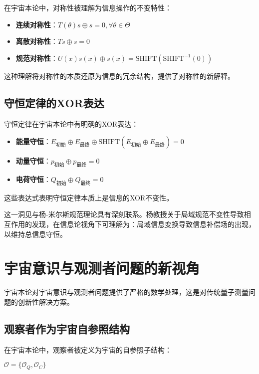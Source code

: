 在宇宙本论中，对称性被理解为信息操作的不变特性：

\begin{itemize}
  \item \textbf{连续对称性}：$T(\theta)s \oplus s = 0, \forall \theta \in \Theta$
  \item \textbf{离散对称性}：$Ts \oplus s = 0$
  \item \textbf{规范对称性}：$U(x)s(x) \oplus s(x) = \text{SHIFT}(\text{SHIFT}^{-1}(0))$
\end{itemize}

这种理解将对称性的本质还原为信息的冗余结构，提供了对称性的新解释。

\subsection{守恒定律的XOR表达}

守恒定律在宇宙本论中有明确的XOR表达：

\begin{itemize}
  \item \textbf{能量守恒}：$E_{\text{初始}} \oplus E_{\text{最终}} \oplus \text{SHIFT}(E_{\text{初始}} \oplus E_{\text{最终}}) = 0$
  \item \textbf{动量守恒}：$p_{\text{初始}} \oplus p_{\text{最终}} = 0$
  \item \textbf{电荷守恒}：$Q_{\text{初始}} \oplus Q_{\text{最终}} = 0$
\end{itemize}

这些表达式表明守恒定律本质上是信息的XOR不变性。

这一洞见与杨-米尔斯规范理论具有深刻联系。杨教授关于局域规范不变性导致相互作用的发现，在信息论视角下可理解为：局域信息变换导致信息补偿场的出现，以维持总信息守恒。

\section{宇宙意识与观测者问题的新视角}

宇宙本论对宇宙意识与观测者问题提供了严格的数学处理，这是对传统量子测量问题的创新性解决方案。

\subsection{观察者作为宇宙自参照结构}

在宇宙本论中，观察者被定义为宇宙的自参照子结构：

$\mathcal{O} = \{\mathcal{O}_Q, \mathcal{O}_C\}$

